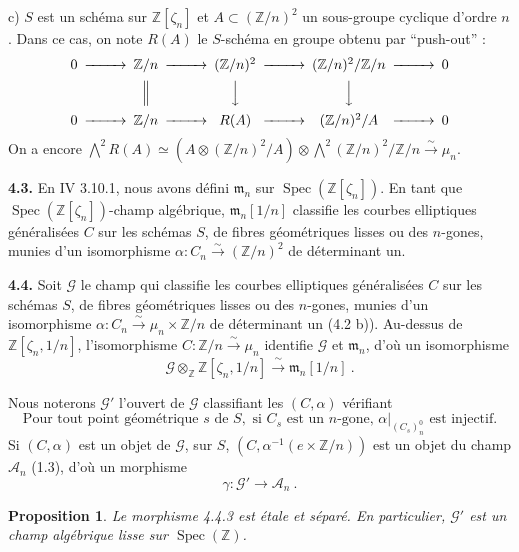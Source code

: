 \documentclass[10pt,a4paper]{amsart}
\theoremstyle{plain}
\newtheorem{proposition}[theorem]{Proposition}
\theoremstyle{definition}
\DeclareMathOperator{\Spec}{Spec}
\newcommand{\m}{\mathfrak{m}}
\newcommand{\cA}{\mathcal{A}}
\newcommand{\cG}{\mathcal{G}}
\newcommand{\ZZ}{\mathbb{Z}}
\begin{document}
c) $S$ est un sch\'ema sur $\ZZ[\zeta_n]$ et $A \subset (\ZZ/n)^2$ un sous-groupe cyclique d'ordre $n$. Dans ce cas, on note $R(A)$ le $S$-sch\'ema en groupe obtenu par ``push-out'' :
\[
\begin{CD}
0 @>>> \ZZ/n @>>> (\ZZ/n)^2 @>>> (\ZZ/n)^2/\ZZ/n @>>> 0 \\
@. @| @VVV @VVV @. \\
0 @>>> \ZZ/n @>>> R(A) @>>> (\ZZ/n)^2/A @>>> 0
\end{CD}
\]
On a encore $\bigwedge^2 R(A) \simeq (A \otimes (\ZZ/n)^2/A) \otimes \bigwedge^2 (\ZZ/n)^2/\ZZ/n \xrightarrow{\sim} \mu_n$.

\medskip\noindent\textbf{4.3.} En IV 3.10.1, nous avons d\'efini $\m_n$ sur $\Spec(\ZZ[\zeta_n])$. En tant que $\Spec(\ZZ[\zeta_n])$-champ alg\'ebrique, $\m_n[1/n]$ classifie les courbes elliptiques g\'en\'eralis\'ees $C$ sur les sch\'emas $S$, de fibres g\'eom\'etriques lisses ou des $n$-gones, munies d'un isomorphisme $\alpha : C_n \xrightarrow{\sim} (\ZZ/n)^2$ de d\'eterminant un.

\medskip\noindent\textbf{4.4.} Soit $\cG$ le champ qui classifie les courbes elliptiques g\'en\'eralis\'ees $C$ sur les sch\'emas $S$, de fibres g\'eom\'etriques lisses ou des $n$-gones, munies d'un isomorphisme $\alpha : C_n \xrightarrow{\sim} \mu_n \times \ZZ/n$ de d\'eterminant un (4.2 b)). Au-dessus de $\ZZ[\zeta_n, 1/n]$, l'isomorphisme $C : \ZZ/n \xrightarrow{\sim} \mu_n$ identifie $\cG$ et $\m_n$, d'o\`u un isomorphisme
\begin{equation}
\cG \otimes_\ZZ \ZZ[\zeta_n, 1/n] \xrightarrow{\;\sim\;} \m_n[1/n]\ .
\end{equation}

Nous noterons $\cG'$ l'ouvert de $\cG$ classifiant les $(C,\alpha)$ v\'erifiant
\begin{equation}
\text{Pour tout point g\'eom\'etrique } s \text{ de } S, \text{ si } C_s \text{ est un } n\text{-gone, } \alpha|_{(C_s)_n^0} \text{ est injectif.}
\end{equation}
Si $(C,\alpha)$ est un objet de $\cG$, sur $S$, $(C, \alpha^{-1}(e \times \ZZ/n))$ est un objet du champ $\cA_n$ (1.3), d'o\`u un morphisme
\begin{equation}
\gamma : \cG' \to \cA_n\ .
\end{equation}

\setcounter{theorem}{4}
\begin{proposition}
Le morphisme 4.4.3 est \'etale et s\'epar\'e. En particulier, $\cG'$ est un champ alg\'ebrique lisse sur $\Spec(\ZZ)$.
\end{proposition}
\end{document}
